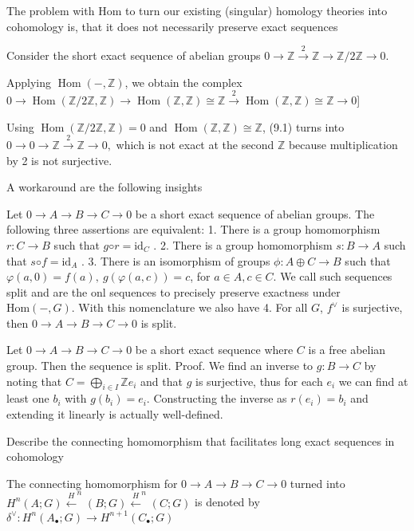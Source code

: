 The problem with \( \text{Hom} \) to turn our existing (singular) homology theories into cohomology is, 
that it does not necessarily preserve exact sequences

Consider the short exact sequence of abelian groups
\( 0 \longrightarrow \mathbb{Z} \xrightarrow{2} \mathbb{Z} \longrightarrow \mathbb{Z}/2\mathbb{Z} \longrightarrow 0. \)

Applying \( \operatorname{Hom}(-, \mathbb{Z}) \), we obtain the complex
\( 0 \longrightarrow \operatorname{Hom}(\mathbb{Z}/2\mathbb{Z}, \mathbb{Z}) \longrightarrow \operatorname{Hom}(\mathbb{Z}, \mathbb{Z}) \cong \mathbb{Z} \xrightarrow{2} \operatorname{Hom}(\mathbb{Z}, \mathbb{Z}) \cong \mathbb{Z} \longrightarrow 0\)] 

Using \(\operatorname{Hom}(\mathbb{Z}/2\mathbb{Z}, \mathbb{Z}) = 0\) and 
\(\operatorname{Hom}(\mathbb{Z}, \mathbb{Z}) \cong \mathbb{Z}\), (9.1) turns into
\( 0 \longrightarrow 0 \longrightarrow \mathbb{Z} \xrightarrow{2} \mathbb{Z} \longrightarrow 0, \)
which is not exact at the second \(\mathbb{Z}\) because multiplication by 2 is not surjective.

A workaround are the following insights

Let \( 0 → A → B → C → 0 \) be a short exact sequence of abelian groups. The
following three assertions are equivalent:
1. There is a group homomorphism \( r : C → B \) such that \( g ◦ r = \text{id}_C \) .
2. There is a group homomorphism \( s : B → A \) such that \( s ◦ f = \text{id}_A \) .
3. There is an isomorphism of groups \( \phi : A \oplus C \to B \) such that
\( \varphi(a, 0) = f(a),\ g(\varphi(a, c)) = c \), for \( a \in A, c \in C \).
We call such sequences split and are the onl sequences to precisely preserve exactness under \( \text{Hom}(-, G) \).
With this nomenclature we also have
4. For all \( G \), \( f^\vee \) is surjective, then \( 0 → A → B → C → 0 \) is split.

Let \(0 → A → B → C → 0\) be a short exact sequence where \( C \) is a free
abelian group. Then the sequence is split.
Proof.
We find an inverse to \( g : B \to C \) by noting that \( C = \bigoplus_{i \in I} \mathbb{Z} e_i \)
and that \( g \) is surjective, thus for each \( e_i \) we can find at least one \( b_i \) with \( g(b_i) = e_i \).
Constructing the inverse as \( r(e_i) = b_i \) and extending it linearly is actually well-defined.

Describe the connecting homomorphism that facilitates long exact sequences in cohomology

The connecting homomorphism for \( 0 → A → B → C → 0 \) turned into \( H^n(A;G) \xleftarrow H^n(B;G) \xleftarrow H^n(C;G)\) is denoted by 
\(\delta^\vee \colon H^n(A_\bullet; G) \to H^{n+1}(C_\bullet; G)\)

